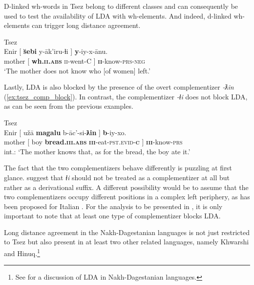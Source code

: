\documentclass[output=paper
,modfonts
,nonflat]{langsci/langscibook}
\begin{document}
D-linked wh-words in Tsez belong to different classes and can consequently be used to test the availability of LDA with wh-elements. And indeed, d-linked wh-elements can trigger long distance agreement.
\begin{exe}
	\ex Tsez \citep[][fn. 20]{Polinsky_Potsdam2001} \label{ex:tsez_wh_dlinked}\\
		\gll Enir [ \textbf{\u{s}ebi} y-\=ak'iru-ɬi ] \textbf{y}-iy-x-\={a}nu.\\
			 mother [ \textbf{wh.\textsc{ii.abs}} \textsc{ii}-went-C ] \textbf{\textsc{ii}}-know-\textsc{prs-neg}\\
		\glt `The mother does not know who [of women] left.'
\end{exe}
Lastly, LDA is also blocked by the presence of the overt complementizer \textit{-ƛin} (\ref{ex:tsez_comp_block}). In contrast, the complementizer \textit{-ɬi} does not block LDA, as can be seen from the previous examples.
\begin{exe}
	\ex Tsez \citep[][635]{Polinsky_Potsdam2001}\label{ex:tsez_comp_block}\\
		\gll * Enir [ u\v{z}\=a \textbf{magalu} b-\=ac’-si-\textbf{ƛin} ] \textbf{b}-iy-xo.\\
			 {} mother [ boy \textbf{bread.\textsc{\textbf{iii}.abs}} \textsc{\textbf{iii}}-eat-\textsc{pst.evid}-\textsc{\textbf{c}} ]	\textsc{\textbf{iii}}-know-\textsc{prs}\\
		\glt int.: `The mother knows that, as for the bread, the boy ate it.'
\end{exe}
The fact that the two complementizers behave differently is puzzling at first glance. \citet[][fn 19]{Polinsky_Potsdam2001} suggest that \textit{ɬi} should not be treated as a complementizer at all but rather as a derivational suffix. A different possibility would be to assume that the two complementizers occupy different positions in a complex left periphery, as has been proposed for Italian \citep{Ledgeway2005}. For the analysis to be presented in , it is only important to note that at least one type of complementizer blocks LDA.

Long distance agreement in the Nakh-Dagestanian languages is not just restricted to Tsez but also present in at least two other related languages, namely Khwarshi and Hinuq.\footnote{See  for a discussion of LDA in Nakh-Dagestanian languages.}
\end{document}
